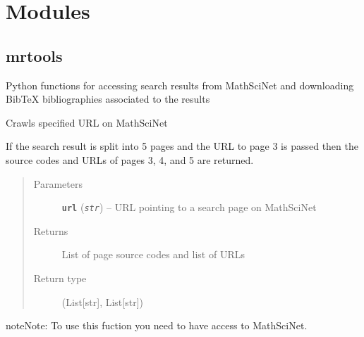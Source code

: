 \documentclass[letterpaper,10pt,english]{sphinxmanual}
\begin{document}
\chapter{Modules}
\label{index:modules}

\section{mrtools}
\label{modules/mrtools::doc}\label{modules/mrtools:module-listb.mrtools}\label{modules/mrtools:mrtools}
Python functions for accessing search results from MathSciNet and
downloading BibTeX bibliographies associated to the results

\begin{fulllineitems}
\label{modules/mrtools:listb.mrtools.crawl}
Crawls specified URL on MathSciNet

If the search result is split into 5 pages and the URL to page
3 is passed then the source codes and URLs of pages 3, 4, and 5
are returned.
\begin{quote}\begin{description}
\item[{Parameters}] \leavevmode
\textbf{\texttt{url}} (\emph{\texttt{str}}) -- URL pointing to a search page on MathSciNet

\item[{Returns}] \leavevmode
List of page source codes and list of URLs

\item[{Return type}] \leavevmode
(List{[}str{]}, List{[}str{]})

\end{description}\end{quote}

\begin{notice}{note}{Note:}
To use this fuction you need to have access to MathSciNet.
\end{notice}

\end{fulllineitems}

\end{document}
